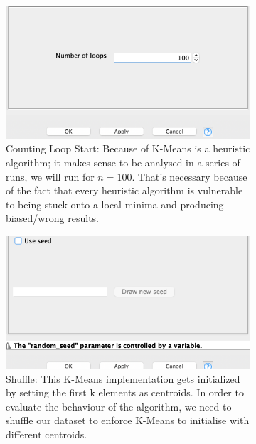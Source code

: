 \documentclass[11pt]{article}
\begin{document}
			\begin{figure}[H]
				\centering
				\begin{subfigure}{0.35\textwidth}
					\includegraphics[width=\textwidth]{res/t1/t15/t15-counting-loop-start-conf}
					\caption{Counting Loop Start: Because of K-Means is a heuristic algorithm; it makes sense to be analysed in a series of runs, we will run for $n=100$. That's necessary because of the fact that every heuristic algorithm is vulnerable to being stuck onto a local-minima and producing biased/wrong results\cite{local-minima}.}
					\label{fig:first}
				\end{subfigure}
				\hfill
				\begin{subfigure}{0.35\textwidth}
					\includegraphics[width=\textwidth]{res/t1/t15/t15-shuffle-conf}
					\caption{Shuffle: This K-Means implementation gets initialized by setting the first k elements as centroids. In order to evaluate the behaviour of the algorithm, we need to shuffle our dataset to enforce K-Means to initialise with different centroids. \cite{k-means-init}}
					\label{fig:second}
				\end{subfigure}
				\hfill
				\begin{subfigure}{0.35\textwidth}

\end{subfigure}
\end{figure}
\end{document}
